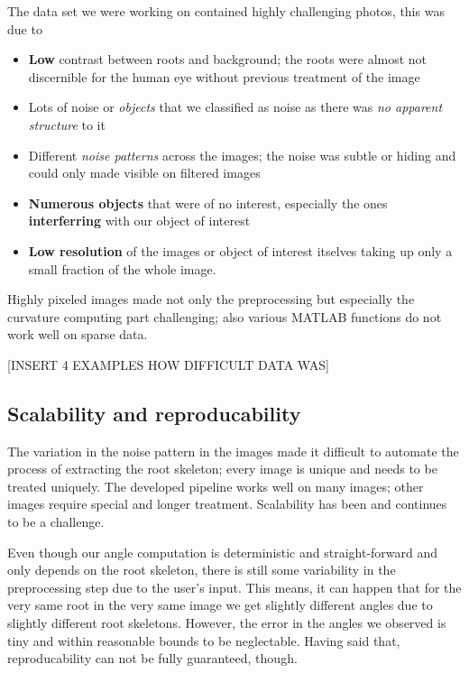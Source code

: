 The data set we were working on contained highly challenging photos, this was due to
\begin{itemize}
	\item \textbf{Low} contrast between roots and background; the roots were almost not discernible for the human eye without previous treatment of the image
	\item Lots of noise or \textit{objects} that we classified as noise as there was \textit{no apparent structure} to it
	\item Different \textit{noise patterns} across the images; the noise was subtle or hiding and could only made visible on filtered images
	\item \textbf{Numerous objects} that were of no interest, especially the ones \textbf{interferring} with our object of interest
	\item \textbf{Low resolution} of the images or object of interest itselves taking up only a small fraction of the whole image. 
\end{itemize}
Highly pixeled images made not only the preprocessing but especially the curvature computing part challenging; also various MATLAB functions do not work well on sparse data.

[INSERT 4 EXAMPLES HOW DIFFICULT DATA WAS]



\subsection{Scalability and reproducability}

The variation in the noise pattern in the images made it difficult to automate the process of extracting the root skeleton; every image is unique and needs to be treated uniquely. The developed pipeline works well on many images; other images require special and longer treatment. Scalability has been and continues to be a challenge.

Even though our angle computation is deterministic and straight-forward and only depends on the root skeleton, there is still some variability in the preprocessing step due to the user's input. This means, it can happen that for the very same root in the very same image we get slightly different angles due to slightly different root skeletons. %
However, the error in the angles we observed is tiny and within reasonable bounds to be neglectable. Having said that, reproducability can not be fully guaranteed, though. 


